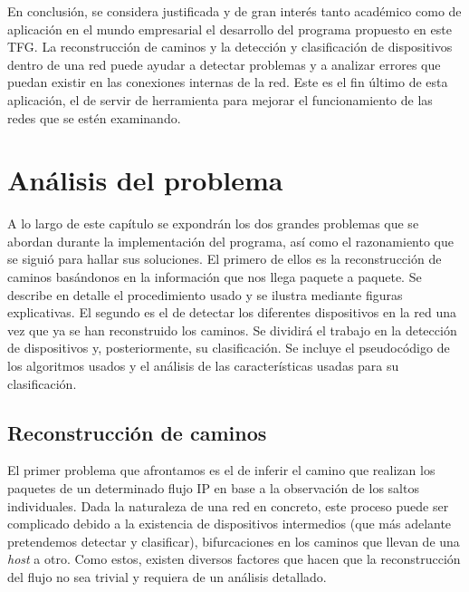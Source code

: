 \documentclass[tfg,epsbased,lof,lot,loa,covers,final,copyright,overleaf]{tfgtfmthesisuam}
\begin{document}
En conclusión, se considera justificada y de gran interés tanto académico como de aplicación en el mundo empresarial el desarrollo del programa propuesto en este TFG. La reconstrucción de caminos y la detección y clasificación de dispositivos dentro de una red puede ayudar a detectar problemas y a analizar errores que puedan existir en las conexiones internas de la red. Este es el fin último de esta aplicación, el de servir de herramienta para mejorar el funcionamiento de las redes que se estén examinando.

\chapter{Análisis del problema}
\label{chap:Analisis}
A lo largo de este capítulo se expondrán los dos grandes problemas que se abordan durante la implementación del programa, así como el razonamiento que se siguió para hallar sus soluciones. El primero de ellos es la reconstrucción de caminos basándonos en la información que nos llega paquete a paquete. Se describe en detalle el procedimiento usado y se ilustra mediante figuras explicativas. El segundo es el de detectar los diferentes dispositivos en la red una vez que ya se han reconstruido los caminos. Se dividirá el trabajo en la detección de dispositivos y, posteriormente, su clasificación. Se incluye el pseudocódigo de los algoritmos usados y el análisis de las características usadas para su clasificación.

\section{Reconstrucción de caminos}
El primer problema que afrontamos es el de inferir el camino que realizan los paquetes de un determinado flujo IP en base a la observación de los saltos individuales. Dada la naturaleza de una red en concreto, este proceso puede ser complicado debido a la existencia de dispositivos intermedios (que más adelante pretendemos detectar y clasificar), bifurcaciones en los caminos que llevan de una \textit{host} a otro. Como estos, existen diversos factores que hacen que la reconstrucción del flujo no sea trivial y requiera de un análisis detallado.
\end{document}

